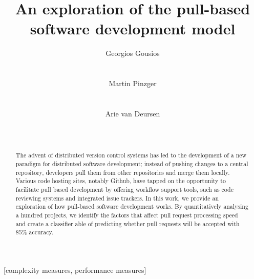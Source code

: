 \documentclass{sig-alternate}
\begin{document}
\newcommand{\todo}[1]{\textbf{TODO}\footnote{\textbf{TODO:} #1}}


\title{An exploration of the pull-based software development model}

\author{
\alignauthor
Georgios Gousios\\
       \\
       \\
\alignauthor
Martin Pinzger\\
       \\
       \\
\alignauthor
Arie van Deursen\\
       \\
       \\       
}

\maketitle

\begin{abstract}

  The advent of distributed version control systems has led to the development
  of a new paradigm for distributed software development; instead of pushing
  changes to a central repository, developers pull them from other repositories
  and merge them locally. Various code hosting sites, notably Github, have
  tapped on the opportunity to facilitate pull based development by offering
  workflow support tools, such as code reviewing systems and integrated issue
  trackers. In this work, we provide an exploration of how pull-based software
  development works. By quantitatively analysing a hundred projects, we
  identify the factors that affect pull request processing speed and
  create a classifier able of predicting whether pull requests will be accepted
  with 85\% accuracy.  

\end{abstract}

[complexity measures, performance measures]
\end{document}
